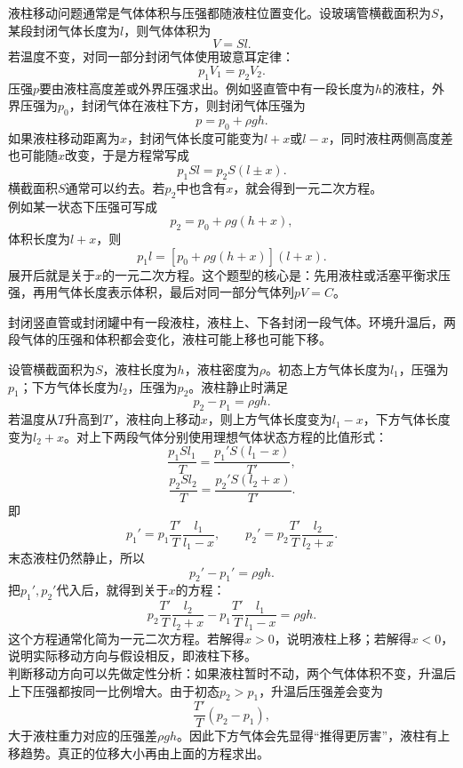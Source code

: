 \begin{casetypebox}[title={\strut\textcolor{white}{\bfseries 常见题型：液柱移动问题}}]
液柱移动问题通常是气体体积与压强都随液柱位置变化。设玻璃管横截面积为$S$，某段封闭气体长度为$l$，则气体体积为
\[
  V=Sl.
\]
若温度不变，对同一部分封闭气体使用玻意耳定律：
\[
  p_1V_1=p_2V_2.
\]
压强$p$要由液柱高度差或外界压强求出。例如竖直管中有一段长度为$h$的液柱，外界压强为$p_0$，封闭气体在液柱下方，则封闭气体压强为
\[
  p=p_0+\rho gh.
\]
如果液柱移动距离为$x$，封闭气体长度可能变为$l+x$或$l-x$，同时液柱两侧高度差也可能随$x$改变，于是方程常写成
\[
  p_1Sl=p_2S(l\pm x).
\]
横截面积$S$通常可以约去。若$p_2$中也含有$x$，就会得到一元二次方程。\\
例如某一状态下压强可写成
\[
  p_2=p_0+\rho g(h+x),
\]
体积长度为$l+x$，则
\[
  p_1l=\left[p_0+\rho g(h+x)\right](l+x).
\]
展开后就是关于$x$的一元二次方程。这个题型的核心是：先用液柱或活塞平衡求压强，再用气体长度表示体积，最后对同一部分气体列$pV=C$。
\end{casetypebox}

\begin{casetypebox}[title={\strut\textcolor{white}{\bfseries 常见题型：封闭罐内液柱受热移动}}]
封闭竖直管或封闭罐中有一段液柱，液柱上、下各封闭一段气体。环境升温后，两段气体的压强和体积都会变化，液柱可能上移也可能下移。\\
\begin{center}
\end{center}
设管横截面积为$S$，液柱长度为$h$，液柱密度为$\rho$。初态上方气体长度为$l_1$，压强为$p_1$；下方气体长度为$l_2$，压强为$p_2$。液柱静止时满足
\[
  p_2-p_1=\rho gh.
\]
若温度从$T$升高到$T'$，液柱向上移动$x$，则上方气体长度变为$l_1-x$，下方气体长度变为$l_2+x$。对上下两段气体分别使用理想气体状态方程的比值形式：
\[
  \frac{p_1Sl_1}{T}=\frac{p_1'S(l_1-x)}{T'},
\]
\[
  \frac{p_2Sl_2}{T}=\frac{p_2'S(l_2+x)}{T'}.
\]
即
\[
  p_1'=p_1\frac{T'}{T}\frac{l_1}{l_1-x},
  \qquad
  p_2'=p_2\frac{T'}{T}\frac{l_2}{l_2+x}.
\]
末态液柱仍然静止，所以
\[
  p_2'-p_1'=\rho gh.
\]
把$p_1',p_2'$代入后，就得到关于$x$的方程：
\[
  p_2\frac{T'}{T}\frac{l_2}{l_2+x}
  -p_1\frac{T'}{T}\frac{l_1}{l_1-x}
  =\rho gh.
\]
这个方程通常化简为一元二次方程。若解得$x>0$，说明液柱上移；若解得$x<0$，说明实际移动方向与假设相反，即液柱下移。\\
判断移动方向可以先做定性分析：如果液柱暂时不动，两个气体体积不变，升温后上下压强都按同一比例增大。由于初态$p_2>p_1$，升温后压强差会变为
\[
  \frac{T'}{T}(p_2-p_1),
\]
大于液柱重力对应的压强差$\rho gh$。因此下方气体会先显得“推得更厉害”，液柱有上移趋势。真正的位移大小再由上面的方程求出。
\end{casetypebox}

